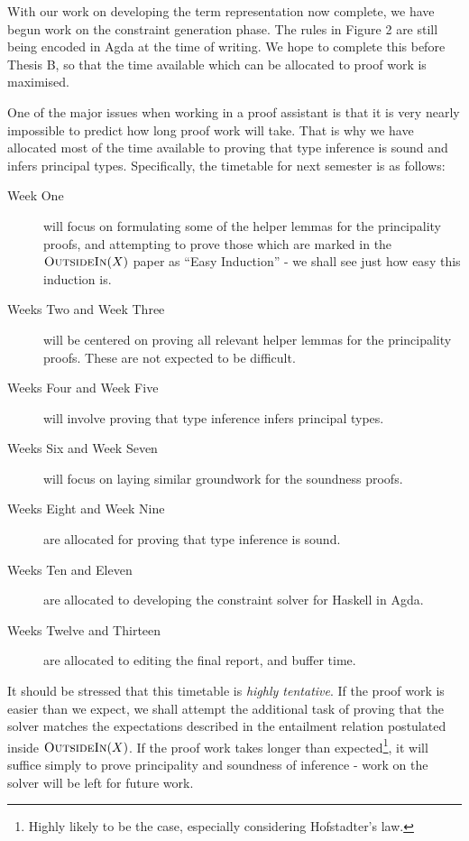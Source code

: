 \documentclass[a4paper]{jfp}
\newcommand{\outsidein}{\textsc{OutsideIn}(X)}
\begin{document}
With our work on developing the term representation now complete, we have begun work on the constraint generation phase. The rules in Figure 2 are still being encoded in Agda at the time of writing. We hope to complete this before Thesis B, so that the time available which can be allocated to proof work is maximised.

One of the major issues when working in a proof assistant is that it is very nearly impossible to predict how long proof work will take. That is why we have allocated most of the time available to proving that type inference is sound and infers principal types. Specifically, the timetable for next semester is as follows:

\begin{description}
	\item[Week One] will focus on formulating some of the helper lemmas for the principality proofs, and attempting to prove those which are marked in the $\outsidein$ paper as ``Easy Induction'' - we shall see just how easy this induction is.
	\item[Weeks Two and Week Three] will be centered on proving all relevant helper lemmas for the principality proofs. These are not expected to be difficult.
	\item[Weeks Four and Week Five] will involve proving that type inference infers principal types.
	\item[Weeks Six and Week Seven] will focus on laying similar groundwork for the soundness proofs.
	\item[Weeks Eight and Week Nine] are allocated for proving that type inference is sound.
	\item[Weeks Ten and Eleven] are allocated to developing the constraint solver for Haskell in Agda.
	\item[Weeks Twelve and Thirteen] are allocated to editing the final report, and buffer time.
\end{description}

It should be stressed that this timetable is \emph{highly tentative}. If the proof work is easier than we expect, we shall attempt the additional task of proving that the solver matches the expectations described in the entailment relation postulated inside $\outsidein$. If the proof work takes longer than expected\footnote{Highly likely to be the case, especially considering Hofstadter's law.}, it will suffice simply to prove principality and soundness of inference - work on the solver will be left for future work.
\end{document}
